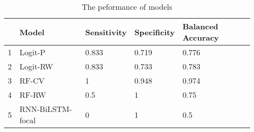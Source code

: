 \begin{table}[ht]
\centering
\begin{tabular}{rllll}
  \hline
 & Model & Sensitivity & Specificity & Balanced Accuracy \\ 
  \hline
1 & Logit-P & 0.833 & 0.719 & 0.776 \\ 
  2 & Logit-RW & 0.833 & 0.733 & 0.783 \\ 
  3 & RF-CV & 1 & 0.948 & 0.974 \\ 
  4 & RF-RW & 0.5 & 1 & 0.75 \\ 
  5 & RNN-BiLSTM-focal & 0 & 1 & 0.5 \\ 
   \hline
\end{tabular}
\caption{The peformance of models} 
\label{tab:res}
\end{table}
